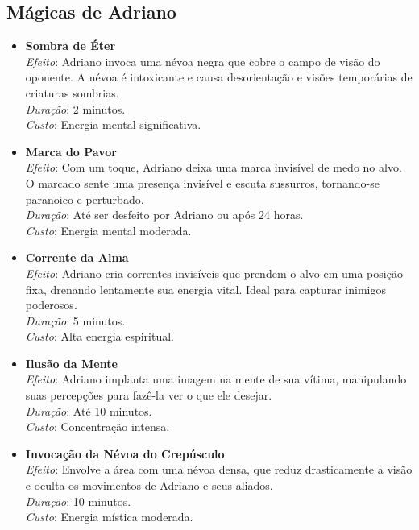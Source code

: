 \subsection{Mágicas de Adriano}

\begin{itemize}
    \item \textbf{Sombra de Éter} \\
    \textit{Efeito}: Adriano invoca uma névoa negra que cobre o campo de visão do oponente. A névoa é intoxicante e causa desorientação e visões temporárias de criaturas sombrias. \\
    \textit{Duração}: 2 minutos. \\
    \textit{Custo}: Energia mental significativa.
    
    \item \textbf{Marca do Pavor} \\
    \textit{Efeito}: Com um toque, Adriano deixa uma marca invisível de medo no alvo. O marcado sente uma presença invisível e escuta sussurros, tornando-se paranoico e perturbado. \\
    \textit{Duração}: Até ser desfeito por Adriano ou após 24 horas. \\
    \textit{Custo}: Energia mental moderada.

    \item \textbf{Corrente da Alma} \\
    \textit{Efeito}: Adriano cria correntes invisíveis que prendem o alvo em uma posição fixa, drenando lentamente sua energia vital. Ideal para capturar inimigos poderosos. \\
    \textit{Duração}: 5 minutos. \\
    \textit{Custo}: Alta energia espiritual.

    \item \textbf{Ilusão da Mente} \\
    \textit{Efeito}: Adriano implanta uma imagem na mente de sua vítima, manipulando suas percepções para fazê-la ver o que ele desejar. \\
    \textit{Duração}: Até 10 minutos. \\
    \textit{Custo}: Concentração intensa.

    \item \textbf{Invocação da Névoa do Crepúsculo} \\
    \textit{Efeito}: Envolve a área com uma névoa densa, que reduz drasticamente a visão e oculta os movimentos de Adriano e seus aliados. \\
    \textit{Duração}: 10 minutos. \\
    \textit{Custo}: Energia mística moderada.


\end{itemize}
